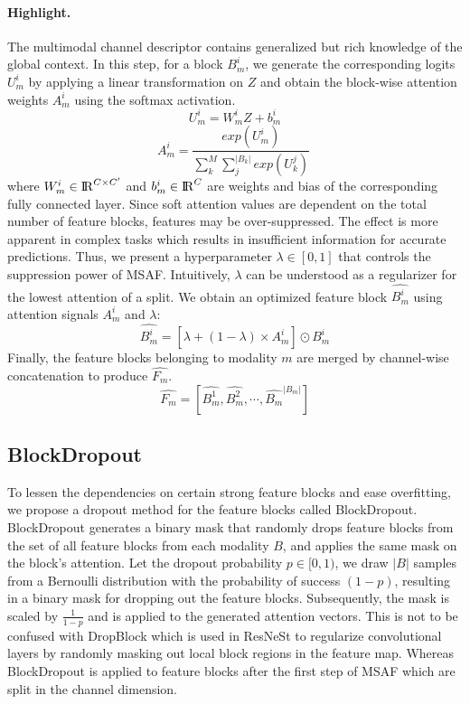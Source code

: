 \documentclass[10pt,twocolumn,letterpaper]{article}
\begin{document}
\paragraph{Highlight.}
The multimodal channel descriptor contains generalized but rich knowledge of the global context. In this step, for a block $B_m^i$, we generate the corresponding logits $U_m^i$ by applying a linear transformation on $Z$ and obtain the block-wise attention weights $A_m^i$ using the softmax activation. 
\begin{equation}
    U_m^i = W_m^i Z + b_m^i
\end{equation}
\begin{equation}
    A_m^i = \frac{exp(U_m^i)}{\sum_{k}^{M} \sum_j^{|B_k|} exp(U^j_k)}\
    \label{atteneq}
\end{equation}
where $W_m^i \in {\rm I\!R}^{C \times C^{\prime}}$ and $b_m^i \in {\rm I\!R}^{C}$ are weights and bias of the corresponding fully connected layer.
Since soft attention values are dependent on the total number of feature blocks, features may be over-suppressed. The effect is more apparent in complex tasks which results in insufficient information for accurate predictions. Thus, we present a hyperparameter $\lambda \in [0, 1]$ that controls the suppression power of MSAF. Intuitively, $\lambda$ can be understood as a regularizer for the lowest attention of a split. We obtain an optimized feature block $\hat{B_m^i}$ using attention signals $A_m^i$ and $\lambda$:
\begin{equation}
    \hat{B_m^i} = [\lambda + (1 - \lambda) \times A_m^i] \odot B_m^i
\end{equation}
Finally, the feature blocks belonging to modality $m$ are merged by channel-wise concatenation to produce $\hat{F_m}$.
\begin{equation}
    \hat{F_m} = [ \hat{B_m^1}, \hat{B_m^2}, \cdots, \hat{B_m}^{|B_m|} ]
\end{equation}

\subsection{BlockDropout}
To lessen the dependencies on certain strong feature blocks and ease overfitting, we propose a dropout method for the feature blocks called BlockDropout. BlockDropout generates a binary mask that randomly drops feature blocks from the set of all feature blocks from each modality $B$, and applies the same mask on the block’s attention. Let the dropout probability $p \in [0, 1)$, we draw $|B|$ samples from a Bernoulli distribution with the probability of success $(1 - p)$, resulting in a binary mask for dropping out the feature blocks. Subsequently, the mask is scaled by $\frac{1}{1 - p}$ and is applied to the generated attention vectors. This is not to be confused with DropBlock \cite{NEURIPS2018_7edcfb2d} which is used in ResNeSt to regularize convolutional layers by  randomly masking out local block regions in the feature map. Whereas BlockDropout is applied to feature blocks after the first step of MSAF which are split in the channel dimension.
\end{document}
